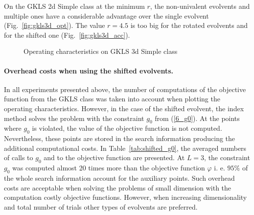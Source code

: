 \documentclass[runningheads]{llncs}
\begin{document}
On the GKLS 2d Simple class at the minimum \(r\), the non-univalent evolvents and multiple
ones have a considerable advantage over the single evolvent (Fig.~\ref{fig:gkls3d_opt}).
The value \(r=4.5\) is too big for the rotated evolvents and for the shifted one
(Fig.~\ref{fig:gkls3d_acc}).

\begin{figure}[ht]
    \centering

    \caption{Operating characteristics on GKLS 3d Simple class}
\end{figure}

\paragraph{Overhead costs when using the shifted evolvents.}
In all experiments presented above, the number of computations of the objective function from
the GKLS class was taken into account when plotting the operating characteristics. However, in
the case of the shifted evolvent, the index method solves the problem with the constraint \(g_0\)
from (\ref{6_g0}). At the points where \(g_0\) is violated, the value of the objective function is
not computed. Nevertheless, these points are stored in the search information producing the
additional computational costs. In Table~\ref{tab:shifted_g0}, the averaged numbers of calls to
\(g_0\) and to the objective function are presented. At \(L=3\), the constraint \(g_0\) was
computed almost 20 times more than the objective function \(\varphi\) i. e. \(95\%\) of the whole
search information account for the auxiliary points. Such overhead costs are acceptable when
solving the problems of small dimension with the computation costly objective functions.
However, when increasing dimensionality and total number of trials other types of evolvents are
preferred.
\end{document}
